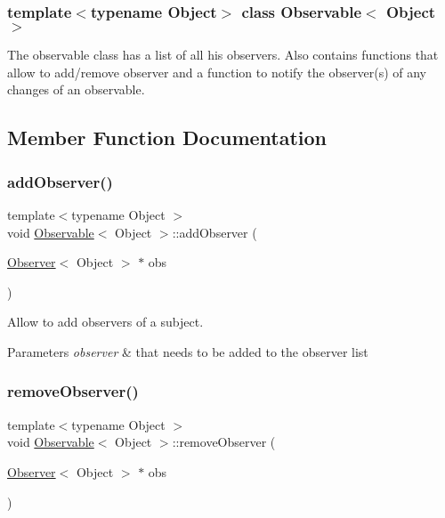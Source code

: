 \subsubsection*{template$<$typename Object$>$\newline
class Observable$<$ Object $>$}

The observable class has a list of all his observers. Also contains functions that allow to add/remove observer and a function to notify the observer(s) of any changes of an observable. 

\subsection{Member Function Documentation}
\mbox{\label{class_observable_ae32f005844f7abe6d3984cca9a13e2a2}} 
\subsubsection{\texorpdfstring{addObserver()}{addObserver()}}
{\footnotesize\ttfamily template$<$typename Object $>$ \\
void \mbox{\hyperlink{class_observable}{Observable}}$<$ Object $>$\+::add\+Observer (\begin{DoxyParamCaption}\item[{\mbox{\hyperlink{class_observer}{Observer}}$<$ Object $>$ $\ast$}]{obs }\end{DoxyParamCaption})}



Allow to add observers of a subject. 


\begin{DoxyParams}{Parameters}
{\em observer} & that needs to be added to the observer list \\
\hline
\end{DoxyParams}
\mbox{\label{class_observable_ae247227a79f81f542d7fe0634a55cdaa}} 
\subsubsection{\texorpdfstring{removeObserver()}{removeObserver()}}
{\footnotesize\ttfamily template$<$typename Object $>$ \\
void \mbox{\hyperlink{class_observable}{Observable}}$<$ Object $>$\+::remove\+Observer (\begin{DoxyParamCaption}\item[{\mbox{\hyperlink{class_observer}{Observer}}$<$ Object $>$ $\ast$}]{obs }\end{DoxyParamCaption})}



